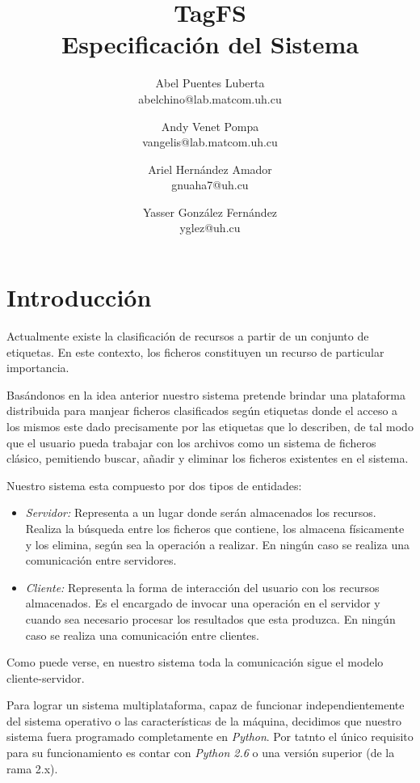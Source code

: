 \documentclass{article}
\title{
	\LARGE{TagFS} \\
	\Large{Especificación del Sistema}
}
\author{
  	Abel Puentes Luberta \\
  	\small{abelchino@lab.matcom.uh.cu}
  	\and
  	Andy Venet Pompa \\
  	\small{vangelis@lab.matcom.uh.cu}
  	\and
  	Ariel Hernández Amador \\
  	\small{gnuaha7@uh.cu}
  	\and
  	Yasser González Fernández \\
  	\small{yglez@uh.cu} 	
}
\date{}
\begin{document}
\maketitle

\thispagestyle{empty}

\newpage

\setcounter{page}{1}

\section{Introducción}

Actualmente existe la clasificación de recursos a partir de un conjunto de 
etiquetas. En este contexto, los ficheros constituyen un recurso de particular 
importancia. 

Basándonos en la idea anterior nuestro sistema pretende brindar una plataforma
distribuida para manjear ficheros clasificados según etiquetas donde el acceso
a los mismos este dado precisamente por las etiquetas que lo describen, de tal
modo que el usuario pueda trabajar con los archivos como un sistema de ficheros
clásico, pemitiendo buscar, añadir y eliminar los ficheros existentes en el
sistema.

Nuestro sistema esta compuesto por dos tipos de entidades:
\begin{itemize}
  \item \emph{Servidor:} Representa a un lugar  donde serán almacenados los
  recursos. Realiza la búsqueda entre los ficheros que contiene, los almacena
  físicamente y los elimina, según sea la operación a realizar. En ningún caso
  se realiza una comunicación entre servidores.
  \item \emph{Cliente:} Representa la forma de interacción del usuario con los
  recursos almacenados. Es el encargado de invocar una operación en el servidor
  y cuando sea necesario procesar los resultados que esta produzca. En ningún
  caso se realiza una comunicación entre clientes.
\end{itemize}

Como puede verse, en nuestro sistema toda la comunicación sigue el modelo
cliente-servidor.

Para lograr un sistema multiplataforma, capaz de funcionar independientemente
del sistema operativo o las características de la máquina, decidimos que nuestro
sistema fuera programado completamente en \emph{Python}. Por tatnto el único
requisito para su funcionamiento es contar con \emph{Python 2.6} o una versión
superior (de la rama 2.x).
\end{document}
